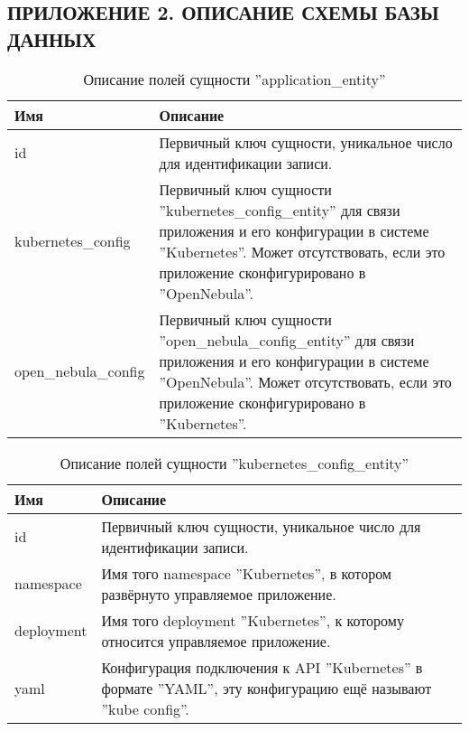 \begin{center}
\section*{ПРИЛОЖЕНИЕ 2. ОПИСАНИЕ СХЕМЫ БАЗЫ ДАННЫХ}
\end{center}

\begin{table}[hbtp]
    \caption{Описание полей сущности ''application\_entity''}
    \begin{tabularx}{\linewidth}{l X}
        \textbf{Имя} & \textbf{Описание} \\
        \hline
        id & Первичный ключ сущности, уникальное число для идентификации записи. \\
        \hline
        kubernetes\_config & Первичный ключ сущности ''kubernetes\_config\_entity'' для связи приложения и его конфигурации в системе ''Kubernetes''. Может отсутствовать, если это приложение сконфигурировано в ''OpenNebula''. \\
        \hline
        open\_nebula\_config & Первичный ключ сущности ''open\_nebula\_config\_entity'' для связи приложения и его конфигурации в системе ''OpenNebula''. Может отсутствовать, если это приложение сконфигурировано в ''Kubernetes''. \\
    \end{tabularx}
    \label{db-scheme-app}
\end{table}

\begin{table}[hbtp]
    \caption{Описание полей сущности ''kubernetes\_config\_entity''}
    \begin{tabularx}{\linewidth}{l X}
        \textbf{Имя} & \textbf{Описание} \\
        \hline
        id & Первичный ключ сущности, уникальное число для идентификации записи. \\
        \hline
        namespace & Имя того namespace ''Kubernetes'', в котором развёрнуто управляемое приложение. \\
        \hline
        deployment & Имя того deployment ''Kubernetes'', к которому относится управляемое приложение. \\
        \hline
        yaml & Конфигурация подключения к API ''Kubernetes'' в формате ''YAML'', эту конфигурацию ещё называют ''kube config''. \\
    \end{tabularx}
    \label{db-scheme-kub}
\end{table}

